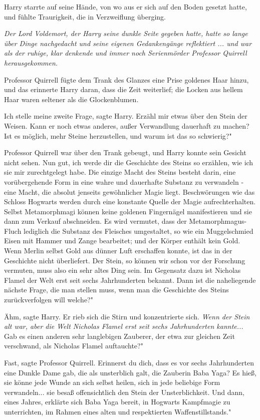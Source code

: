 Harry starrte auf seine Hände, von wo aus er sich auf den Boden gesetzt hatte,
und fühlte Traurigkeit, die in Verzweiflung überging.

\emph{Der Lord Voldemort, der Harry seine dunkle Seite gegeben hatte, hatte so lange über Dinge nachgedacht und seine eigenen Gedankengänge reflektiert ... und war als der ruhige, klar denkende und immer noch Serienmörder Professor Quirrell herausgekommen.}

Professor Quirrell fügte dem Trank des Glanzes eine Prise goldenes Haar hinzu,
und das erinnerte Harry daran, dass die Zeit weiterlief; die Locken aus hellem
Haar waren seltener als die Glockenblumen.

\glqq Ich stelle meine zweite Frage\grqq{}, sagte Harry. \glqq Erzähl mir etwas
über den Stein der Weisen. Kann er noch etwas anderes, außer Verwandlung
dauerhaft zu machen? Ist es möglich, mehr Steine herzustellen, und warum ist das
so schwierig?"

Professor Quirrell war über den Trank gebeugt, und Harry konnte sein Gesicht
nicht sehen. \glqq Nun gut, ich werde dir die Geschichte des Steins so erzählen,
wie ich sie mir zurechtgelegt habe. Die einzige Macht des Steins besteht darin,
eine vorübergehende Form in eine wahre und dauerhafte Substanz zu verwandeln -
eine Macht, die absolut jenseits gewöhnlicher Magie liegt. Beschwörungen wie das
Schloss Hogwarts werden durch eine konstante Quelle der Magie aufrechterhalten.
Selbst Metamorphmagi können keine goldenen Fingernägel manifestieren und sie
dann zum Verkauf abschneiden. Es wird vermutet, dass der Metamorphmagus-Fluch
lediglich die Substanz des Fleisches umgestaltet, so wie ein Muggelschmied Eisen
mit Hammer und Zange bearbeitet; und der Körper enthält kein Gold. Wenn Merlin
selbst Gold aus dünner Luft erschaffen konnte, ist das in der Geschichte nicht
überliefert. Der Stein, so können wir schon vor der Forschung vermuten, muss
also ein sehr altes Ding sein. Im Gegensatz dazu ist Nicholas Flamel der Welt
erst seit sechs Jahrhunderten bekannt. Dann ist die naheliegende nächste Frage,
die man stellen muss, wenn man die Geschichte des Steins zurückverfolgen will
welche?"

\glqq Ähm\grqq{}, sagte Harry. Er rieb sich die Stirn und konzentrierte sich.
\emph{Wenn der Stein alt war, aber die Welt Nicholas Flamel erst seit sechs Jahrhunderten kannte...}
\glqq Gab es einen anderen sehr langlebigen Zauberer, der etwa zur gleichen Zeit
verschwand, als Nicholas Flamel auftauchte?"

\glqq Fast\grqq{}, sagte Professor Quirrell. \glqq Erinnerst du dich, dass es
vor sechs Jahrhunderten eine Dunkle Dame gab, die als unsterblich galt, die
Zauberin Baba Yaga? Es hieß, sie könne jede Wunde an sich selbst heilen, sich in
jede beliebige Form verwandeln... sie besaß offensichtlich den Stein der
Unsterblichkeit. Und dann, eines Jahres, erklärte sich Baba Yaga bereit, in
Hogwarts Kampfmagie zu unterrichten, im Rahmen eines alten und respektierten
Waffenstillstands."

